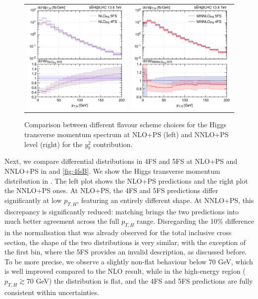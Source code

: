 \documentclass[11pt,a4paper]{article}
\begin{document}
\begin{figure}[t!]
\begin{center}
\begin{tabular}{cc}
\includegraphics[width=.45\textwidth, page=1]{plots/4fs/pt_Higgs_NLO_5FS_4FS.pdf}&
\includegraphics[width=.45\textwidth, page=1]{plots/4fs/pt_Higgs_minnlops_5FS_4FS-FC.pdf}
\end{tabular}
\vspace*{1ex}
\caption{Comparison between different flavour scheme choices for the Higgs transverse momentum spectrum at NLO+PS (left) and NNLO+PS level (right) for the $y_b^2$ contribution. \label{fig:4fsA}}
\end{center}
\end{figure}

Next, we compare differential distributions in 4FS and 5FS at NLO+PS and NNLO+PS in  and \ref{fig:4fsB}. 
We show the Higgs transverse momentum distribution in . The left plot shows the NLO+PS predictions and the right plot the NNLO+PS ones. 
At NLO+PS, the 4FS and 5FS predictions differ significantly at low $p_{T,H}$, featuring an entirely different shape. 
At NNLO+PS, this discrepancy is significantly reduced: \minnlo{} matching brings the two predictions into much better 
agreement across the full $p_{T,H}$ range. Disregarding the 10\% difference in the normalisation that was already observed for 
the total inclusive cross section, the shape of the two distributions is very similar, with the exception of the first bin,
where the 5FS provides an invalid description, as discussed before. To be more precise, we observe a slightly non-flat behaviour below 70 GeV, which is well improved compared to the NLO result, while in the high-energy region ($p_{T,H} \gtrsim 70$ GeV) the distribution is flat, and the 4FS and 5FS predictions are fully consistent within uncertainties.
\end{document}

